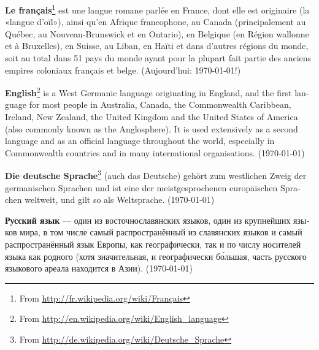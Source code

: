 \documentclass[a4paper]{article}
\begin{document}

\textbf{Le français}\footnote{ From \url{http://fr.wikipedia.org/wiki/Français}} est une langue romane parlée en France, dont elle est originaire (la «langue d'oïl»), ainsi qu'en Afrique francophone, au Canada (principalement au Québec, au Nouveau-Brunswick et en Ontario), en Belgique (en Région wallonne et à Bruxelles), en Suisse, au Liban, en Haïti et dans d'autres régions du monde, soit au total dans 51 pays du monde ayant pour la plupart fait partie des anciens empires coloniaux français et belge.
(Aujourd'hui: \today!)
\bigskip

\begin{english}
\textbf{English}\footnote{From \url{http://en.wikipedia.org/wiki/English_language}} is a West Germanic language originating in England, and the first language for most people in Australia, Canada, the Commonwealth Caribbean, Ireland, New Zealand, the United Kingdom and the United States of America (also commonly known as the Anglosphere). It is used extensively as a second language and as an official language throughout the world, especially in Commonwealth countries and in many international organisations.
(\today)
\end{english}
\bigskip

\begin{german}
\textbf{Die deutsche Sprache}\footnote{ From \url{http://de.wikipedia.org/wiki/Deutsche_Sprache}} (auch das Deutsche) gehört zum westlichen Zweig der germanischen Sprachen und ist eine der meistgesprochenen europäischen Sprachen weltweit, und gilt so als Weltsprache.
(\today)
\end{german}
\bigskip

\begin{russian}
\textbf{Русский язык} — один из восточнославянских языков, один из крупнейших языков мира, в том числе самый распространённый из славянских языков и самый распространённый язык Европы, как географически, так и по числу носителей языка как родного (хотя значительная, и географически бо́льшая, часть русского языкового ареала находится в Азии).	
(\today)
\end{russian}
\bigskip
\end{document}
